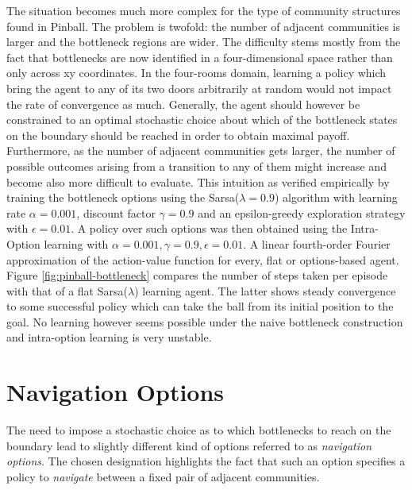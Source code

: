 The situation becomes much more complex for the type of community structures found in Pinball. The problem is twofold: the number of adjacent communities is larger and the bottleneck regions are wider. The difficulty stems mostly from the fact that bottlenecks are now identified in a four-dimensional space rather than only across xy coordinates. In the four-rooms domain, learning a policy which bring the agent to any of its two doors arbitrarily at random would not impact the rate of convergence as much. Generally, the agent should however be constrained to an optimal stochastic choice about which of the bottleneck states on the boundary should be reached in order to obtain maximal payoff. Furthermore, as the number of adjacent communities gets larger, the number of possible outcomes arising from a transition to any of them might increase and become also more difficult to evaluate. This intuition as verified empirically by training the bottleneck options using the Sarsa($\lambda = 0.9$) algorithm with learning rate $\alpha = 0.001$, discount factor $\gamma = 0.9$ and an epsilon-greedy exploration strategy with $\epsilon = 0.01$. A policy over such options was then obtained using the Intra-Option learning with $\alpha = 0.001, \gamma = 0.9, \epsilon = 0.01$. A linear fourth-order Fourier approximation of the action-value function for every, flat or options-based agent. Figure \ref{fig:pinball-bottleneck} compares the number of steps taken per episode with that of a flat Sarsa($\lambda$) learning agent. The latter shows steady convergence to some successful policy which can take the ball from its initial position to the goal. No learning however seems possible under the naive bottleneck construction and intra-option learning is very unstable. 

\section{Navigation Options}

The need to impose a stochastic choice as to which bottlenecks to reach on the boundary lead to slightly different kind of options referred to as \textit{navigation options}. The chosen designation highlights the fact that such an option specifies a policy to \textit{navigate} between a fixed pair of adjacent communities.

